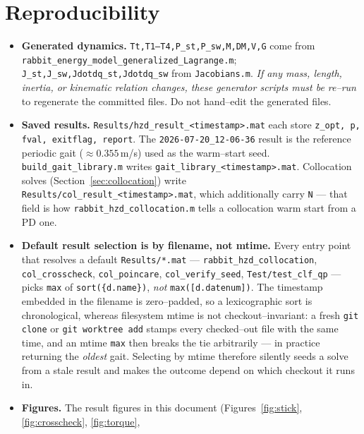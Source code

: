 \documentclass[11pt,a4paper]{article}
\newcommand{\code}[1]{\texttt{#1}}          %
\newcommand{\fname}[1]{\texttt{#1}}          %
\begin{document}
\section{Reproducibility}
\begin{itemize}
  \item \textbf{Generated dynamics.} \code{Tt,T1--T4,P\_st,P\_sw,M,DM,V,G} come
        from \fname{rabbit\_energy\_model\_generalized\_Lagrange.m};
        \code{J\_st,J\_sw,Jdotdq\_st,Jdotdq\_sw} from \fname{Jacobians.m}.
        \emph{If any mass, length, inertia, or kinematic relation changes, these
        generator scripts must be re--run} to regenerate the committed files.
        Do not hand--edit the generated files.
  \item \textbf{Saved results.} \fname{Results/hzd\_result\_<timestamp>.mat}
        each store \code{z\_opt, p, fval, exitflag, report}. The
        \code{2026-07-20\_12-06-36} result is the reference periodic gait
        ($\approx 0.355\,$m/s) used as the warm--start seed.
        \fname{build\_gait\_library.m} writes
        \fname{gait\_library\_<timestamp>.mat}. Collocation solves
        (Section~\ref{sec:collocation}) write
        \fname{Results/col\_result\_<timestamp>.mat}, which additionally carry
        \code{N} --- that field is how \fname{rabbit\_hzd\_collocation.m} tells
        a collocation warm start from a PD one.
  \item \textbf{Default result selection is by filename, not mtime.} Every
        entry point that resolves a default \fname{Results/*.mat} ---
        \fname{rabbit\_hzd\_collocation}, \fname{col\_crosscheck},
        \fname{col\_poincare}, \fname{col\_verify\_seed},
        \fname{Test/test\_clf\_qp} --- picks
        \code{max} of \code{sort(\{d.name\})}, \emph{not} \code{max([d.datenum])}.
        The timestamp embedded in the filename is zero--padded, so a
        lexicographic sort is chronological, whereas filesystem mtime is not
        checkout--invariant: a fresh \code{git clone} or \code{git worktree add}
        stamps every checked--out file with the same time, and an mtime
        \code{max} then breaks the tie arbitrarily --- in practice returning the
        \emph{oldest} gait. Selecting by mtime therefore silently seeds a solve
        from a stale result and makes the outcome depend on which checkout it
        runs in.
  \item \textbf{Figures.} The result figures in this document
        (Figures~\ref{fig:stick}, \ref{fig:crosscheck}, \ref{fig:torque},

\end{itemize}
\end{document}
